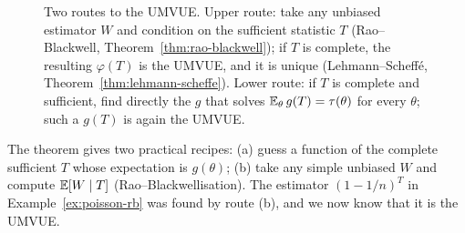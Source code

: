 \documentclass[main.tex]{subfiles}
\begin{document}
\begin{figure}[ht]
\centering
{}
\caption{Two routes to the UMVUE. Upper route: take any unbiased estimator $W$ and condition on the sufficient statistic $T$ (Rao--Blackwell, Theorem~\ref{thm:rao-blackwell}); if $T$ is complete, the resulting $\varphi(T)$ is the UMVUE, and it is unique (Lehmann--Scheffé, Theorem~\ref{thm:lehmann-scheffe}). Lower route: if $T$ is complete and sufficient, find directly the $g$ that solves $\mathbb{E}_\theta\,g(T)=\tau(\theta)$ for every $\theta$; such a $g(T)$ is again the UMVUE.}\label{fig:umvue-yolu}
\end{figure}

\begin{remark}
The theorem gives two practical recipes: (a) guess a function of the complete sufficient $T$ whose expectation is $g(\theta)$; (b) take any simple unbiased $W$ and compute $\mathbb{E}[W\mid T]$ (Rao--Blackwellisation). The estimator $(1-1/n)^T$ in Example~\ref{ex:poisson-rb} was found by route (b), and we now know that it is the UMVUE.
\end{remark}
\end{document}
